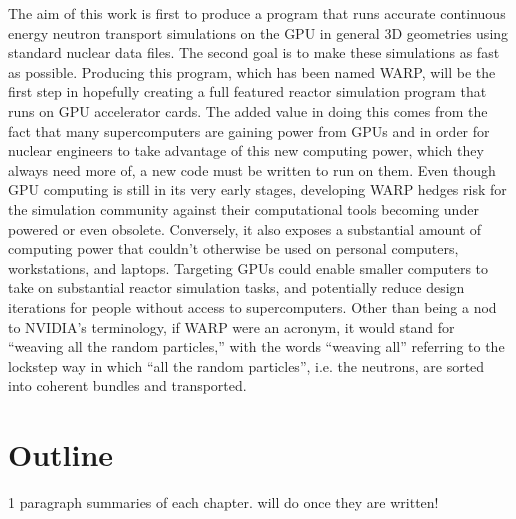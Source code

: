 The aim of this work is first to produce a program that runs accurate continuous energy neutron transport simulations on the GPU in general 3D geometries using standard nuclear data files.  The second goal is to make these simulations as fast as possible.  Producing this program, which has been named WARP, will be the first step in hopefully creating a full featured reactor simulation program that runs on GPU accelerator cards.  The added value in doing this comes from the fact that many supercomputers are gaining power from GPUs and in order for nuclear engineers to take advantage of this new computing power, which they always need more of, a new code must be written to run on them.  Even though GPU computing is still in its very early stages, developing WARP hedges risk for the simulation community against their computational tools becoming under powered or even obsolete.  Conversely, it also exposes a substantial amount of  computing power that couldn't otherwise be used on personal computers, workstations, and laptops.  Targeting GPUs could enable smaller computers to take on substantial reactor simulation tasks, and potentially reduce design iterations for people without access to supercomputers.  Other than being a nod to NVIDIA's terminology, if WARP were an acronym, it would stand for ``weaving all the random particles,'' with the words ``weaving all'' referring to the lockstep way in which ``all the random particles'', i.e. the neutrons, are sorted into coherent bundles and transported.

\section{Outline}

1 paragraph summaries of each chapter.  will do once they are written!
